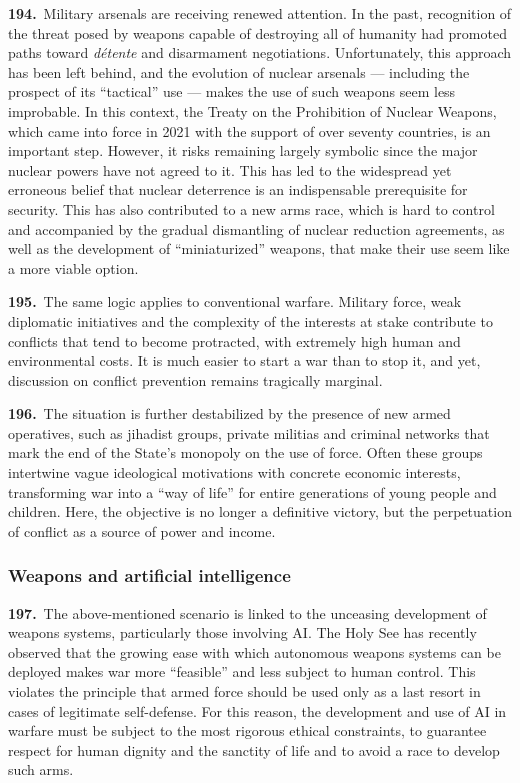 \documentclass{article}
\begin{document}
\textbf{194.}\ Military arsenals are receiving renewed attention. In the past, recognition of the threat posed by weapons capable of destroying all of humanity had promoted paths toward \emph{détente} and disarmament negotiations. Unfortunately, this approach has been left behind, and the evolution of nuclear arsenals --- including the prospect of its ``tactical'' use --- makes the use of such weapons seem less improbable. In this context, the Treaty on the Prohibition of Nuclear Weapons, which came into force in 2021 with the support of over seventy countries, is an important step. However, it risks remaining largely symbolic since the major nuclear powers have not agreed to it. This has led to the widespread yet erroneous belief that nuclear deterrence is an indispensable prerequisite for security. This has also contributed to a new arms race, which is hard to control and accompanied by the gradual dismantling of nuclear reduction agreements, as well as the development of ``miniaturized'' weapons, that make their use seem like a more viable option.

\textbf{195.}\ The same logic applies to conventional warfare. Military force, weak diplomatic initiatives and the complexity of the interests at stake contribute to conflicts that tend to become protracted, with extremely high human and environmental costs. It is much easier to start a war than to stop it, and yet, discussion on conflict prevention remains tragically marginal.

\textbf{196.}\ The situation is further destabilized by the presence of new armed operatives, such as jihadist groups, private militias and criminal networks that mark the end of the State's monopoly on the use of force. Often these groups intertwine vague ideological motivations with concrete economic interests, transforming war into a ``way of life'' for entire generations of young people and children. Here, the objective is no longer a definitive victory, but the perpetuation of conflict as a source of power and income.

\subsubsection{Weapons and artificial intelligence}

\textbf{197.}\ The above-mentioned scenario is linked to the unceasing development of weapons systems, particularly those involving AI. The Holy See has recently observed that the growing ease with which autonomous weapons systems can be deployed makes war more ``feasible'' and less subject to human control. This violates the principle that armed force should be used only as a last resort in cases of legitimate self-defense.\cite{n183} For this reason, the development and use of AI in warfare must be subject to the most rigorous ethical constraints, to guarantee respect for human dignity and the sanctity of life and to avoid a race to develop such arms.\cite{n184}
\end{document}
